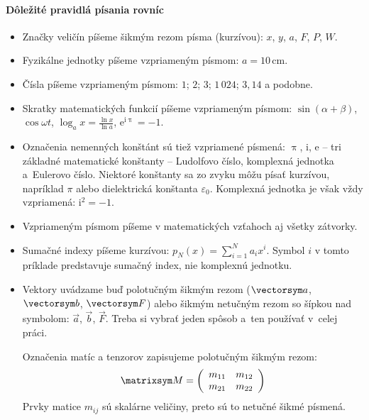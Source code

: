 \paragraph{Dôležité pravidlá písania rovníc}
\begin{itemize}

    \item Značky veličín píšeme šikmým rezom písma (kurzívou):
    $x$, $y$, $a$, $F$, $P$, $W$.

    \item Fyzikálne jednotky píšeme vzpriameným písmom:
    $a = 10\,\mathrm{cm}$.

    \item Čísla píšeme vzpriameným písmom:
    $1$; $2$; $3$; $1\,024$; $3{,}14$ a podobne.

    \item Skratky matematických funkcií píšeme vzpriameným
    písmom: $\sin(\alpha + \beta)$, $\cos\omega t$,
    $\log_a x = \frac{\ln x}{\ln a}$, $\mathrm{e^{i\uppi}}=-1$.

    \item Označenia nemenných konštánt sú tiež vzpriamené
    písmená: $\uppi$, $\mathrm i$, $\mathrm e$ --
    tri základné matematické konštanty --
    Ludolfovo číslo, komplexná jednotka a~Eulerovo číslo.
    Niektoré konštanty sa zo zvyku môžu písať kurzívou,
    napríklad $\pi$ alebo dielektrická konštanta $\varepsilon_0$.
    Komplexná jednotka je však vždy vzpriamená:
    $\mathrm i^2 = -1$.

    \item Vzpriameným písmom píšeme v matematických vzťahoch
    aj všetky zátvorky.

    \item Sumačné indexy píšeme kurzívou:
    $p_N(x) = \sum_{i=1}^N a_ix^i$.
    Symbol $i$ v tomto príklade predstavuje sumačný index,
    nie komplexnú jednotku.

    \item Vektory uvádzame buď polotučným šikmým rezom
    ($\vectorsym a$, $\vectorsym b$, $\vectorsym F$)
    alebo šikmým netučným rezom so šípkou nad symbolom:
    $\vec a$, $\vec b$, $\vec F$.
    Treba si vybrať jeden spôsob a~ten používať v~celej práci.

    Označenia matíc a tenzorov zapisujeme polotučným šikmým rezom:
    $$\matrixsym M = \left( \begin{array}{cc}
                            m_{11} & m_{12}\\
                            m_{21} & m_{22}
                        \end{array}\right)
    $$
    Prvky matice $m_{ij}$ sú skalárne veličiny, preto sú to
    netučné šikmé písmená.


\end{itemize}
